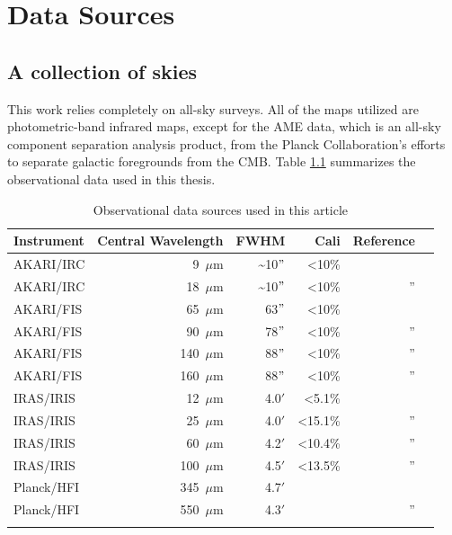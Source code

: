 \chapter{Data Sources}
  \label{ch:datasources}

  \section{A collection of skies}
    This work relies completely on all-sky surveys. All of the maps utilized are photometric-band infrared maps, except for the AME data, which is an all-sky component separation analysis product, from the Planck Collaboration's efforts to separate galactic foregrounds from the CMB. Table \ref{tab:data} summarizes the observational data used in this thesis.
    \begin{table}[h]
      \caption{Observational data sources used in this article}
      \centering
        \begin{tabular}{lrrrrr}
        \hline\hline
        Instrument & Central Wavelength & FWHM & Cali & Reference \\
        \hline
        AKARI/IRC & 9~$\mu$m  &  \~{}10$"$ & \textless 10\%   & \tablefootnote{\cite{ishihara10}} \\
        AKARI/IRC & 18~$\mu$m & \~{}10$"$  & \textless 10\%     & '' \\
        AKARI/FIS & 65~$\mu$m  & 63$"$ & \textless 10\% & \tablefootnote{\cite{doi15,takita16}} \\
        AKARI/FIS & 90~$\mu$m  & 78$"$ & \textless 10\%   & '' \\
        AKARI/FIS & 140~$\mu$m & 88$"$ & \textless 10\%   & '' \\
        AKARI/FIS & 160~$\mu$m & 88$"$ & \textless 10\%   & '' \\
        IRAS/IRIS & 12~$\mu$m   & 4.0$'$ &   \textless 5.1\%       & \tablefootnote{\cite{iris05}} \\
        IRAS/IRIS & 25~$\mu$m   & 4.0$'$ &    \textless 15.1\%      & ''\\
        IRAS/IRIS & 60~$\mu$m   & 4.2$'$ &    \textless 10.4\%      & '' \\
        IRAS/IRIS & 100~$\mu$m  & 4.5$'$ &   \textless 13.5\%       & '' \\
        Planck/HFI & 345~$\mu$m & 4.7$'$ & & \tablefootnote{\cite{hfi14viii}} \\
        Planck/HFI & 550~$\mu$m & 4.3$'$& & '' \\
        \hline
         \label{tab:data}
      \end{tabular}
    \end{table}

